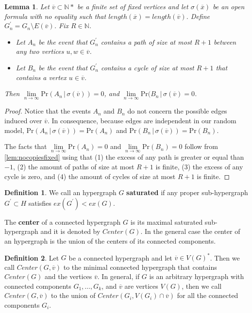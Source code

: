 \documentclass[12pt,notitlepage,a4paper]{article}
\newtheorem{lemma}{Lemma}[section]
\theoremstyle{definition}
\newtheorem{definition}{Definition}[section]
\newcommand{\N}{\mathbb{N}}
\newcommand{\Ln}{\lim\limits_{n\to \infty}}
\begin{document}
\begin{lemma}
	Let $\overline{v} \subset \N*$ be a finite set of fixed vertices and let 
	$\sigma(\overline{x})$ be an open formula with no equality such that
	$length(\overline{x})=length(\overline{v})$. 
	Define $G_n^\prime=G_n \setminus E(\overline{v})$. Fix $R\in \N$. 
	\begin{itemize}
		\item Let $A_n$ be the event that $G^\prime_n$ contains a path of size
		at most	$R+1$ between any two vertices $u,w\in \overline{v}$.
		\item Let $B_n$ be the event
		that $G^\prime_n$ contains a cycle of size at most $R+1$ 
		that contains a vertex $u\in \overline{v}$.
	\end{itemize}
	Then $\Ln \mathrm{Pr}(A_n \, | \, \sigma(\overline{v}))=0$, and 
	$\Ln \mathrm{Pr}(B_n \, | \, \sigma(\overline{v})=0$. 
\end{lemma}
\begin{proof}
	Notice that the events $A_n$ and $B_n$ do not concern the possible edges
	induced over $\overline{v}$. In consequence, because edges are independent
	in our random model, 
	$\mathrm{Pr}(A_n \, | \, \sigma(\overline{v}))
	=\mathrm{Pr}(A_n)$ and 
	$\mathrm{Pr}(B_n \, | \, \sigma(\overline{v}))
	=\mathrm{Pr}(B_n)$.\par
	The facts that $\Ln \mathrm{Pr}(A_n)=0$ and 
	$\Ln \mathrm{Pr}(B_n)=0$ follow
	from \cref{lem:nocopiesfixed} using that 
	(1) the excess of any path is greater or equal than $-1$,
	(2) the amount of paths of size at most $R+1$ is finite,
	(3) the excess of any cycle is zero, and (4) the
	amount of cycles of size at most $R+1$ is finite. 
\end{proof}

\begin{definition}
	We call an hypergraph $G$ \textbf{saturated} if any proper 
	sub-hypergraph $G^\prime \subset H$ satisfies $ex(G^\prime)<ex(G)$. \par
	The \textbf{center} of a connected hypergraph $G$ is its maximal saturated
	sub-hypergraph and it is denoted by $Center(G)$. In the general case 
	the center of an hypergraph is the union of the
	centers of its connected components. 
\end{definition}

\begin{definition}
	Let $G$ be a connected hypergraph and let $\overline{v}\in V(G)^*$.
	Then we call $Center(G, \overline{v})$ to the minimal connected hypergraph
	that contains $Center(G)$ and the vertices $\overline{v}$. In general, if 
	$G$ is an arbitrary hypergraph with connected components $G_1, \dots, G_k$,
	and $\overline{v}$ are vertices $V(G)$, then we call 
	$Center(G, \overline{v})$ to the union of $Center(G_i, V(G_i)\cap
	\overline{v})$ for all the connected components $G_i$.
\end{definition}
\end{document}
